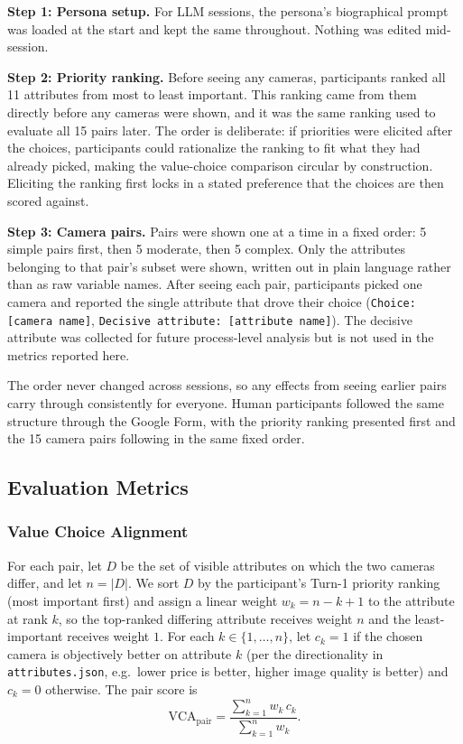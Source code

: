\documentclass{sigchi-ext}
\begin{document}
\textbf{Step 1: Persona setup.}
For LLM sessions, the persona's biographical prompt was loaded at the start and kept the same throughout. Nothing was edited mid-session.

\textbf{Step 2: Priority ranking.}
Before seeing any cameras, participants ranked all 11 attributes from most to least important. This ranking came from them directly before any cameras were shown, and it was the same ranking used to evaluate all 15 pairs later. The order is deliberate: if priorities were elicited after the choices, participants could rationalize the ranking to fit what they had already picked, making the value-choice comparison circular by construction. Eliciting the ranking first locks in a stated preference that the choices are then scored against.

\textbf{Step 3: Camera pairs.}
Pairs were shown one at a time in a fixed order: 5 simple pairs first, then 5 moderate, then 5 complex. Only the attributes belonging to that pair's subset were shown, written out in plain language rather than as raw variable names. After seeing each pair, participants picked one camera and reported the single attribute that drove their choice (\texttt{Choice: [camera name]}, \texttt{Decisive attribute: [attribute name]}). The decisive attribute was collected for future process-level analysis but is not used in the metrics reported here.

The order never changed across sessions, so any effects from seeing earlier pairs carry through consistently for everyone. Human participants followed the same structure through the Google Form, with the priority ranking presented first and the 15 camera pairs following in the same fixed order.

\subsection{Evaluation Metrics}

\subsubsection{Value Choice Alignment}
For each pair, let $D$ be the set of visible attributes on which the two cameras differ, and let $n = |D|$. We sort $D$ by the participant's Turn-1 priority ranking (most important first) and assign a linear weight $w_k = n - k + 1$ to the attribute at rank $k$, so the top-ranked differing attribute receives weight $n$ and the least-important receives weight $1$. For each $k \in \{1,\dots,n\}$, let $c_k = 1$ if the chosen camera is objectively better on attribute $k$ (per the directionality in \texttt{attributes.json}, e.g.\ lower price is better, higher image quality is better) and $c_k = 0$ otherwise. The pair score is
\begin{equation}
\mathrm{VCA}_{\text{pair}} = \frac{\sum_{k=1}^{n} w_k \, c_k}{\sum_{k=1}^{n} w_k}.
\end{equation}
\end{document}
